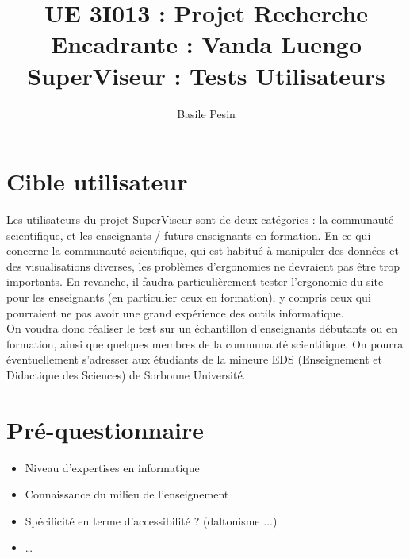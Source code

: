 \documentclass{article}
\title{UE 3I013 : Projet Recherche\\
    Encadrante : Vanda Luengo\\
    SuperViseur : Tests Utilisateurs}
\author{Basile Pesin}
\begin{document}
\maketitle
\newpage

\section{Cible utilisateur}
Les utilisateurs du projet SuperViseur sont de deux catégories : la communauté scientifique, et les enseignants / futurs enseignants en formation. En ce qui concerne la communauté scientifique, qui est habitué à manipuler des données et des visualisations diverses, les problèmes d'ergonomies ne devraient pas être trop importants. En revanche, il faudra particulièrement tester l'ergonomie du site pour les enseignants (en particulier ceux en formation), y compris ceux qui pourraient ne pas avoir une grand expérience des outils informatique.\\
On voudra donc réaliser le test sur un échantillon d'enseignants débutants ou en formation, ainsi que quelques membres de la communauté scientifique. On pourra éventuellement s'adresser aux étudiants de la mineure EDS (Enseignement et Didactique des Sciences) de Sorbonne Université.

\section{Pré-questionnaire}
\begin{itemize}
    \item Niveau d'expertises en informatique
    \item Connaissance du milieu de l'enseignement
    \item Spécificité en terme d'accessibilité ? (daltonisme ...)
    \item \ldots
\end{itemize}
\end{document}
